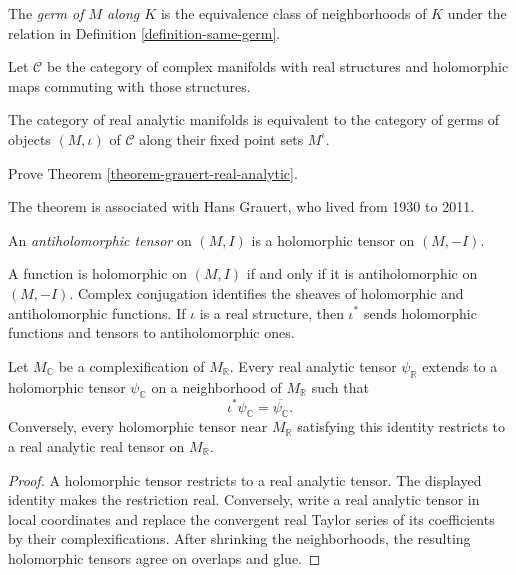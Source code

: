 \begin{definition}
\label{definition-germ-manifold}
The {\it germ of $M$ along $K$} is the
equivalence class of neighborhoods of $K$
under the relation in Definition
\ref{definition-same-germ}.
\end{definition}

Let $\mathcal{C}$ be the category of complex
manifolds with real structures and
holomorphic maps commuting with those
structures.

\begin{theorem}[Grauert]
\label{theorem-grauert-real-analytic}
The category of real analytic manifolds is
equivalent to the category of germs of
objects $(M,\iota)$ of $\mathcal{C}$ along
their fixed point sets $M^\iota$.
\end{theorem}

\begin{exercise}
\label{exercise-grauert-equivalence}
Prove Theorem
\ref{theorem-grauert-real-analytic}.
\end{exercise}

The theorem is associated with Hans Grauert,
who lived from 1930 to 2011.

\begin{definition}
\label{definition-antiholomorphic-tensor}
An {\it antiholomorphic tensor} on $(M,I)$
is a holomorphic tensor on $(M,-I)$.
\end{definition}

A function is holomorphic on $(M,I)$ if and
only if it is antiholomorphic on $(M,-I)$.
Complex conjugation identifies the sheaves
of holomorphic and antiholomorphic
functions. If $\iota$ is a real structure,
then $\iota^*$ sends holomorphic functions
and tensors to antiholomorphic ones.

\begin{theorem}
\label{theorem-extend-analytic-tensors}
Let $M_{\mathbb{C}}$ be a complexification
of $M_{\mathbb{R}}$. Every real analytic
tensor $\psi_{\mathbb{R}}$ extends to a
holomorphic tensor $\psi_{\mathbb{C}}$ on a
neighborhood of $M_{\mathbb{R}}$ such that
$$
\iota^*\psi_{\mathbb{C}}
=\overline{\psi_{\mathbb{C}}}.
$$
Conversely, every holomorphic tensor near
$M_{\mathbb{R}}$ satisfying this identity
restricts to a real analytic real tensor on
$M_{\mathbb{R}}$.
\end{theorem}

\begin{proof}
A holomorphic tensor restricts to a real
analytic tensor. The displayed identity
makes the restriction real. Conversely,
write a real analytic tensor in local
coordinates and replace the convergent real
Taylor series of its coefficients by their
complexifications. After shrinking the
neighborhoods, the resulting holomorphic
tensors agree on overlaps and glue.
\end{proof}

